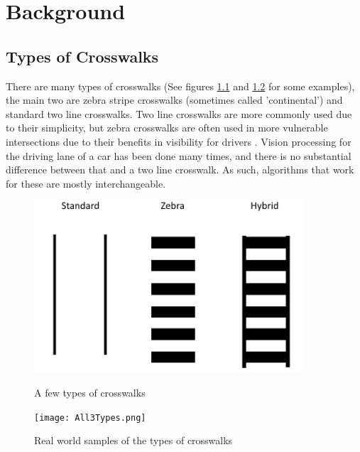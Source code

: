 \documentclass[12pt]{ucthesis}
\newcommand{\captionfonts}{\small\bf\ssp}
\begin{document}
\chapter{Background}
\section{Types of Crosswalks}

There are many types of crosswalks (See figures \ref{fig:TypesOfXwalksFig} and \ref{fig:TypesOfXwalksRealFig} for some examples), the main two are zebra stripe crosswalks (sometimes called 'continental') and standard two line crosswalks. Two line crosswalks are more commonly used due to their simplicity, but zebra crosswalks are often used in more vulnerable intersections due to their benefits in visibility for drivers \cite{crosswalkTypeEvaluation}. Vision processing for the driving lane of a car has been done many times, and there is no substantial difference between that and a two line crosswalk. As such, algorithms that work for these are mostly interchangeable.

\begin{figure}[t]
\begin{center}
\includegraphics[width=10cm]{TypesOfXwalks.png}
\captionfonts
\caption[Three Types of Crosswalks]{A few types of crosswalks}
\label{fig:TypesOfXwalksFig}
\end{center}
\end{figure}

\begin{figure}[t]
\begin{center}
\texttt{[image: All3Types.png]}
\captionfonts
\caption[Real Photos of Crosswalk Types]{Real world samples of the types of crosswalks}
\label{fig:TypesOfXwalksRealFig}
\end{center}
\end{figure}
\end{document}
